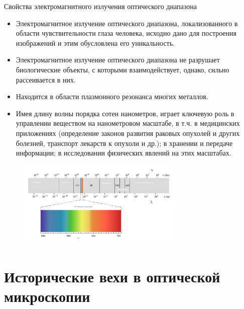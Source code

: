 \documentclass[9pt, compress, xcolor=table]{beamer}
\begin{document}
\begin{frame}{Свойства электромагнитного излучения оптического диапазона}

\begin{itemize}
    \item \small{Электромагнитное излучение оптического диапазона, локализованного в области чувствительности глаза человека, исходно дано для построения изображений и этим обусловлена его уникальность.}
    
    \item \small{Электромагнитное излучение оптического диапазона не разрушает биологические объекты, с которыми взаимодействует, однако, сильно рассеивается в них.}
    
    \item \small{Находится в области плазмонного резонанса многих металлов.}
    
    \item \small{Имея длину волны порядка сотен нанометров, играет ключевую роль в управлении веществом на нанометровом масштабе, в т.ч. в медицинских приложениях (определение законов развития раковых опухолей и других болезней, транспорт лекарств к опухоли и др.); в хранении и передаче информации; в исследовании физических явлений на этих масштабах.}
    
\end{itemize}

\begin{figure}
\centering
\includegraphics[width=0.7\textwidth]{EM_spectrum}
\end{figure}

\end{frame}

\section{Исторические вехи в оптической микроскопии}
\end{document}
